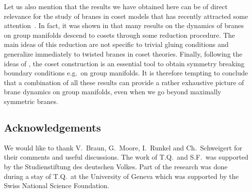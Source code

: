 \documentclass[12pt,a4paper]{article}
\begin{document}
Let us also mention that the results we have obtained here can 
be of direct relevance for the study of branes in coset models
that has recently attracted some attention~\cite{Stanciu:1998sk,  
Fredenhagen:2001nc,Maldacena:2001ky,Gawedzki:2001ye,Elitzur:2001qd,
Fredenhagen:2001kw}. In fact, it was shown in \cite{Fredenhagen:2001nc,
Fredenhagen:2001kw} that many results on the dynamics of branes on group 
manifolds descend to cosets through some reduction procedure. The 
main ideas of this reduction are not specific to trivial gluing 
conditions and generalize immediately to twisted branes in coset 
theories. Finally, following the ideas of \cite{Maldacena:2001ky,
Quella:2002ct}, the coset construction is an essential tool to obtain  
symmetry breaking boundary conditions e.g.\ on group manifolds. It 
is therefore tempting to conclude that a combination of all these 
results can provide a rather exhaustive picture of brane dynamics
on group manifolds, even when we go beyond maximally symmetric 
branes.  


\subsection*{Acknowledgements}

We would like to thank V.\ Braun, G.\ Moore, I.\ Runkel and 
Ch.\ Schweigert  for their comments and useful discussions. 
The work of T.Q.\ and S.F.\ was supported by the 
Studienstiftung des deutschen Volkes. Part of the research was done 
during a stay of T.Q.\ at the University of Geneva which was supported
by the Swiss National Science Foundation. 
\end{document}
